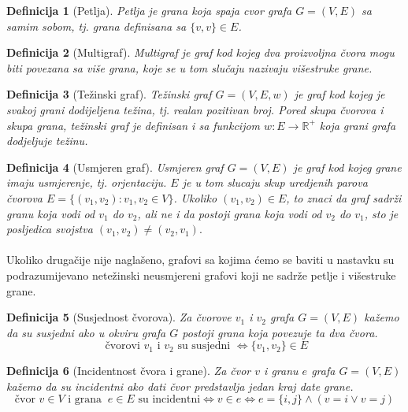 \documentclass[11pt]{article}
\newtheorem{definition}{Definicija}
\begin{document}
		\begin{definition}[Petlja]
		Petlja je grana koja spaja cvor grafa $G=(V,E)$ sa samim sobom, tj. grana definisana sa $\{v,v\} \in E$.
		\end{definition}
	
		\begin{definition}[Multigraf]
		Multigraf je graf kod kojeg dva proizvoljna čvora mogu biti povezana sa više grana, koje se u tom slučaju nazivaju višestruke grane.
		\end{definition}
	
		\begin{definition}[Težinski graf]
		Težinski graf $G =(V,E,w)$ je graf kod kojeg je svakoj grani dodijeljena težina, tj. realan pozitivan broj. Pored skupa čvorova i skupa grana, težinski graf je definisan i sa funkcijom $w: E \to \mathbb{R}^+$ koja grani grafa dodjeljuje težinu.
		\end{definition}
	
		\begin{definition}[Usmjeren graf]
		Usmjeren graf $G =(V,E)$ je graf kod kojeg grane imaju usmjerenje, tj. orjentaciju. $E$ je u tom slucaju skup uredjenih parova čvorova $E = \{ (v_1,v_2) : v_1, v_2 \in V\}$. 
		Ukoliko $(v_1,v_2) \in E$, to znaci da graf sadrži granu koja vodi od $v_1$ do $v_2$, ali ne i da postoji grana koja vodi od $v_2$ do $v_1$, sto je posljedica svojstva $(v_1,v_2) \neq (v_2,v_1).$
		\end{definition}
	
		\paragraph{}
		Ukoliko drugačije nije naglašeno, grafovi sa kojima ćemo se baviti u nastavku su podrazumijevano netežinski neusmjereni grafovi koji ne sadrže petlje i višestruke grane.
	
		\begin{definition}[Susjednost čvorova]
		Za čvorove $v_1$ i $v_2$ grafa $G = (V, E)$ kažemo da su susjedni ako u okviru grafa $G$ postoji grana koja povezuje ta dva čvora.
		\[\text{ čvorovi } v_1  \text{ i } v_2 \text{ su susjedni } \Leftrightarrow \{v_1, v_2\} \in E \]
		\end{definition}
		
		\begin{definition}[Incidentnost čvora i grane]
		Za čvor $v$ i granu $e$ grafa $G = (V, E)$ kažemo da su incidentni ako dati čvor predstavlja jedan kraj date grane.
		\[ \text{čvor } v \in V \text{ i grana }\ e \in E \text{ su incidentni} \Leftrightarrow v \in e \Leftrightarrow e = \{i,j\} \land ( v = i  \lor  v = j) \] 
		\end{definition}
	
\end{document}
